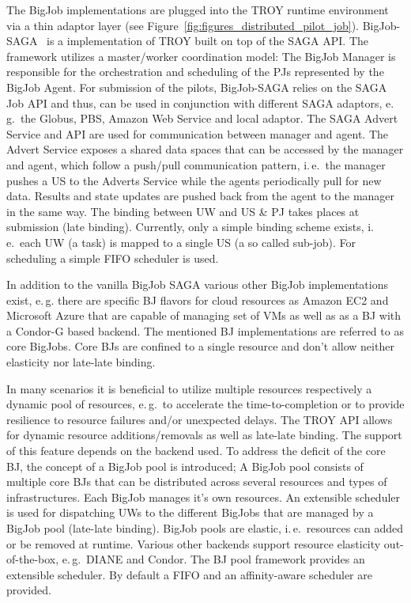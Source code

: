\documentclass[conference,final]{IEEEtran}
\begin{document}
	


The BigJob implementations are plugged into the TROY runtime environment via a
thin adaptor layer (see Figure~\ref{fig:figures_distributed_pilot_job}).
BigJob-SAGA~\cite{saga_bigjob_condor_cloud} is a implementation of TROY built on
top of the SAGA API. The framework utilizes a master/worker coordination model:
The BigJob Manager is responsible for the orchestration and scheduling of the
PJs represented by the BigJob Agent. For submission of the pilots, BigJob-SAGA
relies on the SAGA Job API and thus, can be used in conjunction with different
SAGA adaptors, e.\,g.\ the Globus, PBS, Amazon Web Service and local adaptor.
The SAGA Advert Service and API are used for communication between manager and
agent. The Advert Service exposes a shared data spaces that can be accessed by
the manager and agent, which follow a push/pull communication pattern, i.\,e.\
the manager pushes a US to the Adverts Service while the agents periodically
pull for new data. Results and state updates are pushed back from the agent to
the manager in the same way. The binding between UW and US \& PJ takes places at
submission (late binding). Currently, only a simple binding scheme exists,
i.\,e.\ each UW (a task) is mapped to a single US (a so called sub-job). For
scheduling a simple FIFO scheduler is used.

In addition to the vanilla BigJob SAGA various other BigJob implementations
exist, e.\,g. there are specific BJ flavors for cloud resources as Amazon EC2
and Microsoft Azure that are capable of managing set of VMs as well as as a BJ
with a Condor-G based backend. The mentioned BJ implementations are referred to
as core BigJobs. Core BJs are confined to a single resource and don't allow
neither elasticity nor late-late binding.


In many scenarios it is beneficial to utilize multiple resources
respectively a dynamic pool of resources, e.\,g.\ to accelerate the
time-to-completion or to provide resilience to resource failures
and/or unexpected delays. The TROY API allows for dynamic resource
additions/removals as well as late-late binding. The support of this
feature depends on the backend used. To address the deficit of the
core BJ, the concept of a BigJob pool is introduced; A BigJob pool
consists of multiple core BJs that can be distributed across several
resources and types of infrastructures. Each BigJob manages it's own
resources. An extensible scheduler is used for dispatching UWs to the
different BigJobs that are managed by a BigJob pool (late-late
binding). BigJob pools are elastic, i.\,e.\ resources can added or be
removed at runtime. Various other backends support resource elasticity
out-of-the-box, e.\,g.\ DIANE and Condor. The BJ pool framework
provides an extensible scheduler. By default a FIFO and an
affinity-aware scheduler are provided.
\end{document}
